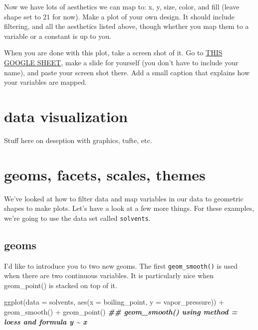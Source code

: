 \documentclass[
]{krantz}
\newenvironment{Shaded}{\begin{snugshade}}{\end{snugshade}}
\newcommand{\AttributeTok}[1]{\textcolor[rgb]{0.77,0.63,0.00}{#1}}
\newcommand{\DocumentationTok}[1]{\textcolor[rgb]{0.56,0.35,0.01}{\textbf{\textit{#1}}}}
\newcommand{\FunctionTok}[1]{\textcolor[rgb]{0.00,0.00,0.00}{#1}}
\newcommand{\NormalTok}[1]{#1}
\newcommand{\SpecialCharTok}[1]{\textcolor[rgb]{0.00,0.00,0.00}{#1}}
\begin{document}
Now we have lots of aesthetics we can map to: x, y, size, color, and fill (leave shape set to 21 for now). Make a plot of your own design. It should include filtering, and all the aesthetics listed above, though whether you map them to a variable or a constant is up to you.

When you are done with this plot, take a screen shot of it. Go to \href{https://docs.google.com/presentation/d/1G0BJ_qye9a_HAPLktFytj66qSj20BjoUOTKtjmCyuN0/edit?usp=sharing}{THIS GOOGLE SHEET}, make a slide for yourself (you don't have to include your name), and paste your screen shot there. Add a small caption that explains how your variables are mapped.

\hypertarget{data-visualization}{%
\section*{data visualization}\label{data-visualization}}

Stuff here on deseption with graphics, tufte, etc.

\hypertarget{geoms_facets_scales_themes}{%
\section{geoms, facets, scales, themes}\label{geoms_facets_scales_themes}}

We've looked at how to filter data and map variables in our data to geometric shapes to make plots. Let's have a look at a few more things. For these examples, we're going to use the data set called \texttt{solvents}.

\hypertarget{geoms}{%
\subsection{geoms}\label{geoms}}

I'd like to introduce you to two new geoms. The first \texttt{geom\_smooth()} is used when there are two continuous variables. It is particularly nice when geom\_point() is stacked on top of it.

\begin{Shaded}
\begin{Highlighting}[]
\FunctionTok{ggplot}\NormalTok{(}\AttributeTok{data =}\NormalTok{ solvents, }\FunctionTok{aes}\NormalTok{(}\AttributeTok{x =}\NormalTok{ boiling\_point, }\AttributeTok{y =}\NormalTok{ vapor\_pressure)) }\SpecialCharTok{+} 
  \FunctionTok{geom\_smooth}\NormalTok{() }\SpecialCharTok{+}
  \FunctionTok{geom\_point}\NormalTok{()}
\DocumentationTok{\#\# \textasciigrave{}geom\_smooth()\textasciigrave{} using method = \textquotesingle{}loess\textquotesingle{} and formula \textquotesingle{}y \textasciitilde{} x\textquotesingle{}}
\end{Highlighting}
\end{Shaded}
\end{document}
